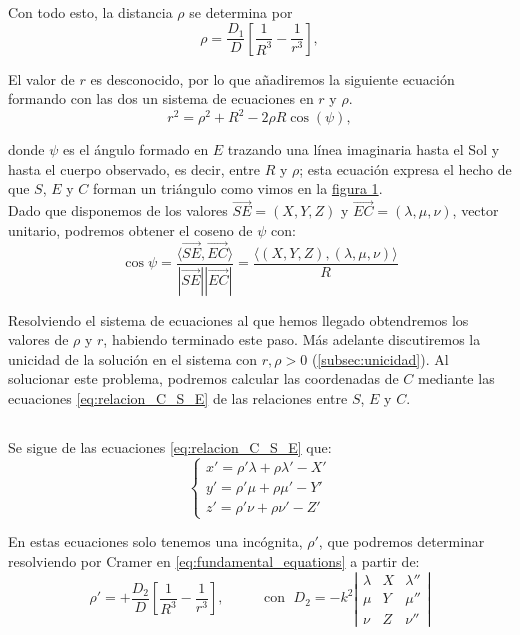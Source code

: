 \documentclass[11pt]{article}
\begin{document}
Con todo esto, la distancia $\rho$ se determina por
\[
\rho = \frac{D_1}{D}[\frac{1}{R^3}-\frac{1}{r^3}],
\]

El valor de $r$ es desconocido, por lo que añadiremos la siguiente ecuación formando con las dos un sistema de ecuaciones en $r$ y $\rho$.
\[
r^2=\rho^2+R^2-2\rho R\cos(\psi),
\]

\noindent donde $\psi$ es el ángulo formado en $E$ trazando una línea imaginaria hasta el Sol y hasta el cuerpo observado, es decir, entre $R$ y $\rho$; esta ecuación expresa el hecho de que $S$, $E$ y $C$ forman un triángulo como vimos en la \hyperref[figure:1]{figura 1}.\\

Dado que disponemos de los valores $\overrightarrow{SE}=(X,Y,Z)$ y $\overrightarrow{EC}=(\lambda,\mu,\nu)$, vector unitario, podremos obtener el coseno de $\psi$ con:
\[
\cos{\psi}=\frac{\langle\overrightarrow{SE},\overrightarrow{EC}\rangle}{|\overrightarrow{SE}||\overrightarrow{EC}|}=\frac{\langle(X,Y,Z),(\lambda,\mu,\nu)\rangle}{R}
\]

Resolviendo el sistema de ecuaciones al que hemos llegado obtendremos los valores de $\rho$ y $r$, habiendo terminado este paso. Más adelante discutiremos la unicidad de la solución en el sistema con $r,\rho>0$ (\ref{subsec:unicidad}). Al solucionar este problema, podremos calcular las coordenadas de $C$ mediante las ecuaciones \eqref{eq:relacion_C_S_E} de las relaciones entre $S$, $E$ y $C$.\\

\subsection{}
\label{subsec:velocity_component}
Se sigue de las ecuaciones \eqref{eq:relacion_C_S_E} que:
\[
\left\{
\begin{array}{l}
	x'=\rho'\lambda+\rho\lambda'-X'\\
	y'=\rho'\mu+\rho\mu'-Y'\\
	z'=\rho'\nu+\rho\nu'-Z'
\end{array}
\right.	
\]

En estas ecuaciones solo tenemos una incógnita, $\rho'$, que podremos determinar resolviendo por Cramer en \eqref{eq:fundamental_equations} a partir de:
\[
\rho'=+\frac{D_2}{D}[\frac{1}{R^3}-\frac{1}{r^3}],
\; \; \; \; \; \; \; \; \; \text{ con } \;
D_2 = -k^2
\left|
\begin{array}{ccc}
\lambda & X & \lambda''\\
\mu & Y & \mu''\\
\nu & Z & \nu''
\end{array}
\right|
\]
\end{document}
